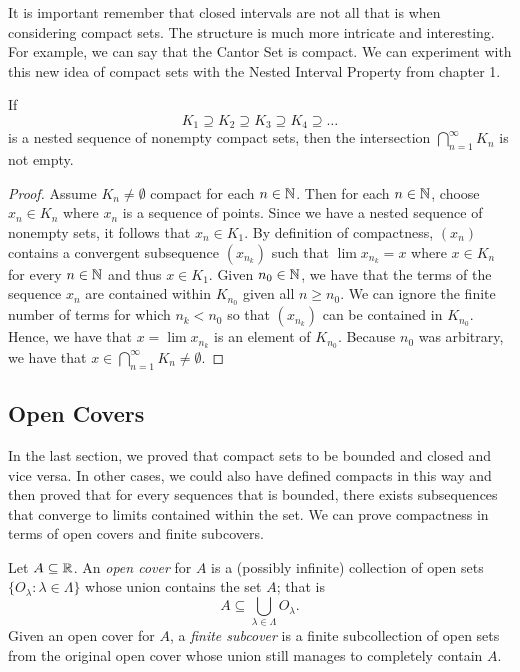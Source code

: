 It is important remember that closed intervals are not all that is when considering compact sets. The structure is much more intricate and interesting. For example, we can say that the Cantor Set is compact. We can experiment with this new idea of compact sets with the Nested Interval Property from chapter 1.


\begin{theorem}
    If 
    \[ K_1 \supseteq K_2 \supseteq K_3 \supseteq K_4 \supseteq \dots \]
    is a nested sequence of nonempty compact sets, then the intersection \( \bigcap_{ n=1 }^{ \infty  } K_n  \) is not empty.
    \end{theorem}

\begin{proof}
    Assume \( K_n \neq \emptyset  \) compact for each \( n \in \mathbb{N} \). Then for each \(  n \in \mathbb{N} \), choose \( x_n \in K_n \) where \( x_n \) is a sequence of points. Since we have a nested sequence of nonempty sets, it follows that \( x_n \in K_1 \). By definition of compactness, \( (x_n) \) contains a convergent subsequence \( (x_{n_k}) \) such that \( \lim x_{n_k} = x  \) where \( x \in K_n \) for every \( n \in \mathbb{N} \) and thus \( x \in K_1 \). Given \( n_0 \in \mathbb{N} \), we have that the terms of the sequence \( x_n  \) are contained within \( K_{n_0} \) given all \( n \geq n_0 \). We can ignore the finite number of terms for which \( n_k < n_0  \) so that \( (x_{n_k}) \) can be contained in \( K_{n_0} \). Hence, we have that \( x = \lim x_{n_k} \) is an element of \( K_{n_0} \). Because \( n_0  \) was arbitrary, we have that \( x \in \bigcap_{ n=1 }^{ \infty  } K_n \neq \emptyset\).
\end{proof}

\subsection{Open Covers}
In the last section, we proved that compact sets to be bounded and closed and vice versa. In other cases, we could also have defined compacts in this way and then proved that for every sequences that is bounded, there exists subsequences that converge to limits contained within the set. We can prove compactness in terms of open covers and finite subcovers. 

\begin{definition}
    Let \( A \subseteq \mathbb{R} \). An \textit{open cover} for \( A \) is a (possibly infinite) collection of open sets \( \{ O_{\lambda} : \lambda \in \Lambda \}  \) whose union contains the set \( A \); that is 
    \[ A \subseteq \bigcup_{ \lambda \in \Lambda } O_{\lambda}.  \]
    Given an open cover for \( A \), a \textit{finite subcover} is a finite subcollection of open sets from the original open cover whose union still manages to completely contain \( A \).
\end{definition}

